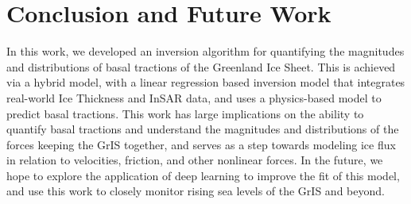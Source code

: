\documentclass{article}
\begin{document}
\section{Conclusion and Future Work}

In this work, we developed an inversion algorithm for quantifying the magnitudes and distributions of basal tractions of the Greenland Ice Sheet. This is achieved via a hybrid model, with a linear regression based inversion model that integrates real-world Ice Thickness and InSAR data, and uses a physics-based model to predict basal tractions. This work has large implications on the ability to quantify basal tractions and understand the magnitudes and distributions of the forces keeping the GrIS together, and serves as a step towards modeling ice flux in relation to velocities, friction, and other nonlinear forces. In the future, we hope to explore the application of deep learning to improve the fit of this model, and use this work to closely monitor rising sea levels of the GrIS and beyond.



\end{document}
